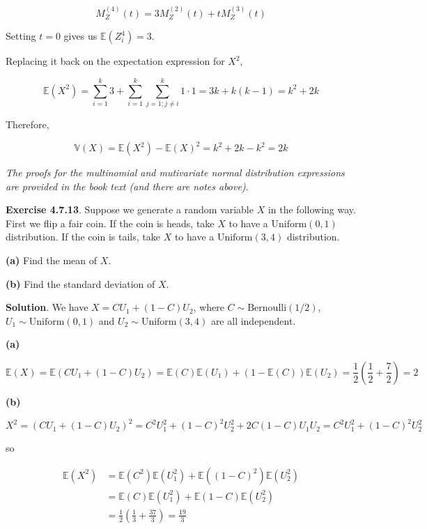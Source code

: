 \[ M_Z^{(4)}(t) = 3 M_Z^{(2)}(t) + t M_Z^{(3)}(t)\]

Setting \(t = 0\) gives us \(\mathbb{E}(Z_{i}^{4}) = 3\).

Replacing it back on the expectation expression for \(X^{2}\),

\[
\mathbb{E}(X^{2}) = \sum_{i=1}^{k} 3 + \sum_{i=1}^{k} \sum_{j=1; j \neq i}^{k} 1 \cdot 1 = 3k + k(k-1) = k^{2} + 2k
\]

Therefore,

\[ \mathbb{V}(X) = \mathbb{E}(X^{2}) - \mathbb{E}(X)^{2} = k^{2} + 2k - k^{2} = 2k \]

\emph{The proofs for the multinomial and mutivariate normal distribution
expressions are provided in the book text (and there are notes above).}

\textbf{Exercise 4.7.13}. Suppose we generate a random variable \(X\) in
the following way. First we flip a fair coin. If the coin is heads, take
\(X\) to have a \(\text{Uniform}(0, 1)\) distribution. If the coin is
tails, take \(X\) to have a \(\text{Uniform}(3, 4)\) distribution.

\textbf{(a)} Find the mean of \(X\).

\textbf{(b)} Find the standard deviation of \(X\).

\textbf{Solution}. We have \(X = C U_{1} + (1 - C)U_{2}\), where
\(C \sim \text{Bernoulli}(1/2)\), \(U_{1} \sim \text{Uniform}(0, 1)\) and
\(U_{2} \sim \text{Uniform}(3, 4)\) are all independent.

\textbf{(a)}

\[\mathbb{E}(X) = \mathbb{E}(CU_{1} + (1 - C)U_{2}) = \mathbb{E}(C)\mathbb{E}(U_{1}) + (1 - \mathbb{E}(C))\mathbb{E}(U_{2}) = \frac{1}{2} \left(\frac{1}{2} + \frac{7}{2}\right) = 2\]

\textbf{(b)}

\[ X^{2} = (CU_{1} + (1 - C)U_{2})^{2} = C^{2}U_{1}^{2} + (1 - C)^{2} U_{2}^{2} + 2C(1 - C)U_{1}U_{2} = C^{2}U_{1}^{2} + (1 - C)^{2} U_{2}^{2} \]

so

\begin{align*}
\mathbb{E}(X^{2}) &= \mathbb{E}(C^{2})\mathbb{E}(U_{1}^{2}) + \mathbb{E}((1 - C)^{2}) \mathbb{E}(U_{2}^{2}) \\
&= \mathbb{E}(C) \mathbb{E}(U_{1}^{2}) + \mathbb{E}(1 - C) \mathbb{E}(U_{2}^{2}) \\
&= \frac{1}{2} \left( \frac{1}{3} + \frac{37}{3} \right) = \frac{19}{3}
\end{align*}

